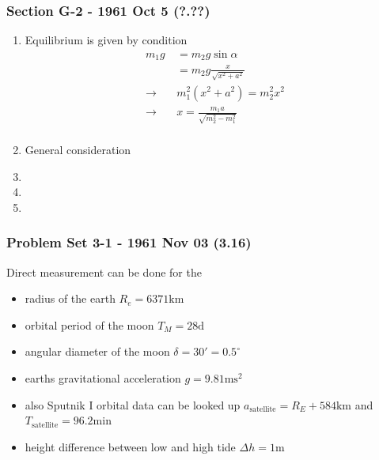 \documentclass[10pt,a4paper]{article}
\theoremstyle{definition}
\begin{document}
\subsubsection{Section G-2 - 1961 Oct 5 (?.??)}
\begin{enumerate}
    \item Equilibrium is given by condition
    \begin{align}
        m_1g&=m_2g\sin\alpha\\
        &=m_2g\frac{x}{\sqrt{x^2+a^2}}\\
        \rightarrow\quad& m_1^2(x^2+a^2)=m_2^2 x^2\\
        \rightarrow\quad& x=\frac{m_1 a}{\sqrt{m_2^2-m_1^2}}\\
    \end{align}
    \item General consideration
    \begin{center}
    \end{center}
    
    \item
    \item
    \item
\end{enumerate}

\subsubsection{Problem Set 3-1 - 1961 Nov 03 (3.16)}
Direct measurement can be done for the
\begin{itemize}
    \item radius of the earth $R_e=6371\text{km}$
    \item orbital period of the moon $T_M=28\text{d}$
    \item angular diameter of the moon $\delta=30'=0.5^\circ$
    \item earths gravitational acceleration $g=9.81\text{ms}^2$
    \item also Sputnik I orbital data can be looked up $a_\text{satellite}=R_E+584\text{km}$ and $T_\text{satellite}=96.2\text{min}$
    \item height difference between low and high tide $\Delta h=1\text{m}$
\end{itemize}
\end{document}
